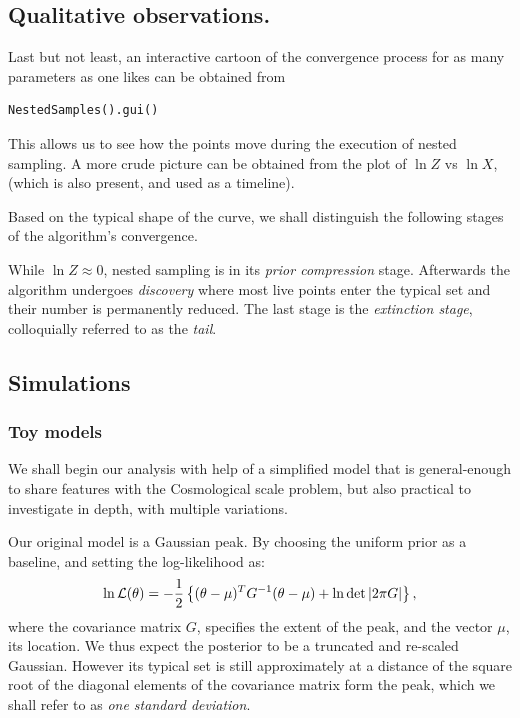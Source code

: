 \documentclass[usenatbib]{mnras}
\begin{document}
\subsection{Qualitative observations.}
\label{sec:orge086b66}
Last but not least, an interactive cartoon of the convergence
process for as many parameters as one likes can be obtained from

\begin{verbatim}
NestedSamples().gui()
\end{verbatim}
This allows us to see how the points move during the execution of
nested sampling. A more crude picture can be obtained from the plot
of \(\ln Z\) vs \(\ln X\), (which is also present, and used as a
timeline).

Based on the typical shape of the curve, we shall distinguish the
following stages of the algorithm's convergence. 

While \(\ln Z \approx 0\), nested sampling is in its \emph{prior
compression} stage.  Afterwards the algorithm undergoes \emph{discovery}
where most live points enter the typical set and their number is
permanently reduced. The last stage is the \emph{extinction stage},
colloquially referred to as the \emph{tail}.


\subsection{Simulations}
\label{sec:org7801d9e}
\subsubsection{Toy models}
\label{sec:org1080888}

We shall begin our analysis with help of a simplified model that is
general-enough to share features with the Cosmological scale
problem, but also practical to investigate in depth, with multiple
variations.

Our original model is a Gaussian peak. By choosing the uniform
prior as a baseline, and setting the log-likelihood as:
\begin{equation}
  \ln {\cal L}(\theta) = - \frac{1}{2} \left\{(\theta - \mu)^{T}G^{-1}(\theta-\mu)  + \ln \det \left| 2\pi G\right| \right\},
\end{equation}
where the covariance matrix \(G\), specifies the extent of the peak,
and the vector \(\mu\), its location. We thus expect the posterior
to be a truncated and re-scaled Gaussian. However its typical set
is still approximately at a distance of the square root of the
diagonal elements of the covariance matrix form the peak, which we
shall refer to as \emph{one standard deviation}.
\end{document}
